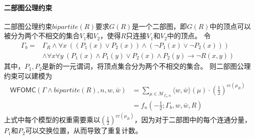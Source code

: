 \documentclass[12pt,UTF8,AutoFakeBold=3,a4paper]{ctexart} %
\newcommand{\sentence}{\Gamma}
\newcommand{\weight}{w}
\newcommand{\negweight}{\bar{w}}
\newcommand{\symwfomc}{\ensuremath{\mathsf{WFOMC}}}
\newcommand{\fomodels}[2]{\mathcal{M}_{#1, #2}}
\newcommand{\typeweight}[1]{\langle \weight, \negweight\rangle(#1)}
\newcommand{\symsentence}{\sentence_R}
\begin{document}
\paragraph{二部图公理约束}
二部图公理约束$bipartite(R)$要求$G(R)$是一个二部图，即$G(R)$中的顶点可以被分为两个不相交的集合$V_1$和$V_2$，使得$R$只连接$V_1$和$V_2$中的顶点。
令
\begin{align*}
  \sentence_b = &\symsentence \land \forall x \ ((P_1(x) \lor P_2(x)) \land (\lnot P_1(x) \lor \lnot P_2(x))) \\
    &\land \forall x \forall y \ \left( P_1(x) \land P_1(y) \lor P_2(x) \land P_2(y) \to \lnot R(x,y) \right)
\end{align*}
其中，$P_1, P_2$是新的一元谓词，将顶点集合分为两个不相交的集合。
则二部图公理约束可以建模为
\begin{align*}
  \symwfomc(\sentence \land bipartite(R), n, \weight, \negweight) &= \sum_{\mu\in\fomodels{\sentence_b}{n}} \typeweight{\mu}\cdot (\frac{1}{2})^{cc(\mu_R)} \\
  &= f_n(-\frac 12; \sentence_b, \weight, \negweight, R)
\end{align*}
上式中每个模型的权重需要乘以$(\frac{1}{2})^{cc(\mu_R)}$，因为对于二部图中的每个连通分量，$P_1$和$P_2$可以交换位置，从而导致了重复计数。


\end{document}
